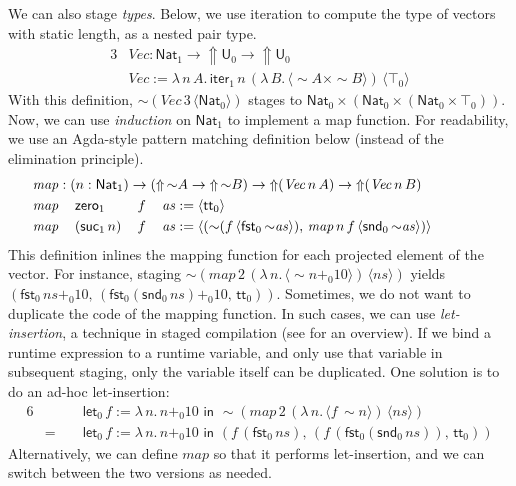 \documentclass[acmsmall]{acmart}
\newcommand{\mit}[1]{\mathit{#1}}
\newcommand{\msf}[1]{\mathsf{#1}}
\newcommand{\Lift}{{\Uparrow}}
\newcommand{\spl}{{\sim}}
\newcommand{\qut}[1]{\langle #1\rangle}
\renewcommand{\U}{\msf{U}}
\newcommand{\Nat}{\msf{Nat}}
\newcommand{\zero}{\msf{zero}}
\newcommand{\suc}{\msf{suc}}
\renewcommand{\tt}{\msf{tt}}
\newcommand{\fst}{\msf{fst}}
\newcommand{\snd}{\msf{snd}}
\newcommand{\mylet}{\msf{let}}
\theoremstyle{remark}
\begin{document}
We can also stage \emph{types}. Below, we use iteration to compute the type of
vectors with static length, as a nested pair type.
\begin{alignat*}{3}
  &\mit{Vec} : \Nat_1 \to \Lift \U_0 \to \Lift \U_0\\
  &\mit{Vec} := \lambda\,n\,A.\,\msf{iter}_1\,n\,(\lambda\,B.\,\qut{\spl A \times \spl B})\,\qut{\top_0}
\end{alignat*}
With this definition, $\spl(\mit{Vec}\,3\,\qut{\Nat_0})$ stages to $\Nat_0
\times (\Nat_0 \times (\Nat_0 \times \top_0))$. Now, we can use \emph{induction}
on $\Nat_1$ to implement a map function. For readability, we use an Agda-style
pattern matching definition below (instead of the elimination principle).
\begin{alignat*}{6}
  &\hspace{-3em}\rlap{$\mit{map} : (n : \Nat_1) \to (\Lift\,\spl A \to \Lift\,\spl B) \to \Lift(\mit{Vec}\,n\,A) \to \Lift(\mit{Vec}\,n\,B)$}\\
  &\hspace{-3em}\mit{map}\,&&\zero_1      && f\,&&\mit{as} := \qut{\tt_0}\\
  &\hspace{-3em}\mit{map}\,&&(\suc_1\,n)\,&& f\,&&\mit{as} :=
     \qut{(\spl(f\,\qut{\fst_0\,\spl\mit{as}}),\,\mit{map}\,n\,f\,\qut{\snd_0\,\spl \mit{as}})}
\end{alignat*}
This definition inlines the mapping function for each projected element of the
vector. For instance, staging $\spl(\mit{map}\,2\,(\lambda\,n.\,\qut{\spl n +_0
  10})\,\qut{\mit{ns}})$ yields $(\fst_0\,\mit{ns} +_0
10,\,(\fst_0(\snd_0\,\mit{ns}) +_0 10,\,\tt_0))$. Sometimes, we do not want to
duplicate the code of the mapping function. In such cases, we can use
\emph{let-insertion}, a technique in staged compilation (see
\cite{staging-with-delimited-control} for an overview). If we bind a runtime
expression to a runtime variable, and only use that variable in subsequent
staging, only the variable itself can be duplicated. One solution is to do an
ad-hoc let-insertion:
\begin{alignat*}{6}
  &   && \mylet_0\,f := \lambda\,n.\, n +_0 10\,\,\msf{in}\,\,
         \spl(\mit{map}\,2\,(\lambda\,n.\,\qut{f\,\spl n})\,\qut{\mit{ns}}) \\
  & =\,\,&&  \mylet_0\,f := \lambda\,n.\, n +_0 10\,\,\msf{in}\,\,
          (f\,(\fst_0\,\mit{ns}),\,(f\,(\fst_0(\snd_0\,\mit{ns})),\,\tt_0))
\end{alignat*}
 Alternatively, we can define $\mit{map}$ so that it performs let-insertion, and
 we can switch between the two versions as needed.
\end{document}
